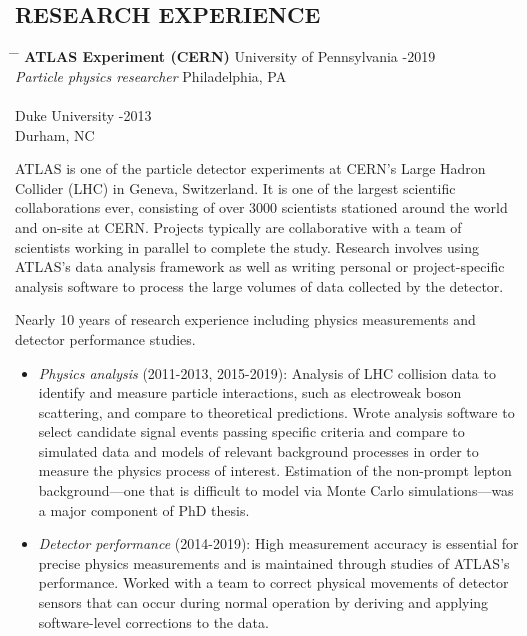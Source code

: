 \documentclass{res}
\begin{document}
\begin{resume}
\section{RESEARCH EXPERIENCE}\vspace{-5pt}
   \begin{tabbing}
   \hspace{2.5in}\= \hspace{2.85in} \= \kill %
    {\bf ATLAS Experiment (CERN)} \>University of Pennsylvania -2019\\
    {\it Particle physics researcher} \> Philadelphia, PA \\
    \\
    \> Duke University -2013 \\
    \> Durham, NC
   \end{tabbing}\vspace{-18pt}
   ATLAS is one of the particle detector experiments at CERN's Large Hadron Collider (LHC) in Geneva, Switzerland. 
   It is one of the largest scientific collaborations ever, consisting of over 3000 scientists stationed around the world and on-site at CERN.
   Projects typically are collaborative with a team of scientists working in parallel to complete the study.
   Research involves using ATLAS's data analysis framework as well as writing personal or project-specific analysis software to process the large volumes of data collected by the detector.

   Nearly 10 years of research experience including physics measurements and detector performance studies.
   \begin{itemize}
     \item {\it Physics analysis} (2011-2013, 2015-2019): Analysis of LHC collision data to identify and measure particle interactions, such as electroweak boson scattering, and compare to theoretical predictions.
           Wrote analysis software to select candidate signal events passing specific criteria and compare to simulated data and models of relevant background processes in order to measure the physics process of interest.
           Estimation of the non-prompt lepton background---one that is difficult to model via Monte Carlo simulations---was a major component of PhD thesis.
     \item {\it Detector performance} (2014-2019): High measurement accuracy is essential for precise physics measurements and is maintained through studies of ATLAS's performance.
           Worked with a team to correct physical movements of detector sensors that can occur during normal operation by deriving and applying software-level corrections to the data.
   \end{itemize}


\end{resume}
\end{document}
